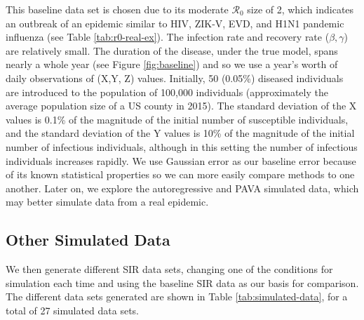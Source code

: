 \documentclass[12pt]{article}
\newcommand{\rr}{\ensuremath{\mathcal{R}_0}}
\begin{document}
      This baseline data set is chosen due to its moderate $\rr$ size of 2, which indicates an outbreak of an epidemic similar to HIV, ZIK-V, EVD, and H1N1 pandemic influenza (see Table \ref{tab:r0-real-ex}).  The infection rate and recovery rate ($\beta, \gamma$) are relatively small.  The duration of the disease, under the true model, spans nearly a whole year (see Figure \ref{fig:baseline}) and so we use a year's worth of daily observations of (X,Y, Z) values.  Initially, 50 (0.05\%) diseased individuals are introduced to the population of 100,000 individuals (approximately the average population size of a US county in 2015).  The standard deviation of the X values is 0.1\% of the magnitude of the initial number of susceptible individuals, and the standard deviation of the Y values is 10\% of the magnitude of the initial number of infectious individuals, although in this setting the number of infectious individuals increases rapidly.  We use Gaussian error as our baseline error because of its known statistical properties so we can more easily compare methods to one another.  Later on, we explore the autoregressive and PAVA simulated data, which may better simulate data from  a real epidemic.

      \subsection{Other Simulated Data}

We then generate different SIR data sets, changing one of the conditions for simulation each time and using the baseline SIR data as our basis for comparison. The different data sets generated are shown in Table \ref{tab:simulated-data}, for a total of 27 simulated data sets.

\end{document}
